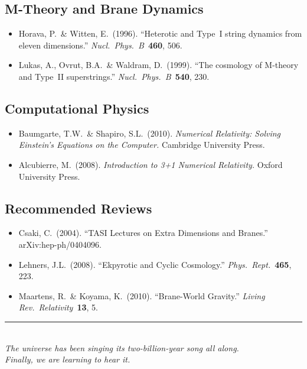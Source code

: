 \subsection*{M-Theory and Brane Dynamics}
\begin{itemize}
  \item Horava, P.\ \& Witten, E.\ (1996). ``Heterotic and Type~I string dynamics from eleven dimensions.'' \textit{Nucl.\ Phys.\ B}\ \textbf{460}, 506.
  \item Lukas, A., Ovrut, B.A.\ \& Waldram, D.\ (1999). ``The cosmology of M-theory and Type~II superstrings.'' \textit{Nucl.\ Phys.\ B}\ \textbf{540}, 230.
\end{itemize}

\subsection*{Computational Physics}
\begin{itemize}
  \item Baumgarte, T.W.\ \& Shapiro, S.L.\ (2010). \textit{Numerical Relativity: Solving Einstein's Equations on the Computer.} Cambridge University Press.
  \item Alcubierre, M.\ (2008). \textit{Introduction to 3+1 Numerical Relativity.} Oxford University Press.
\end{itemize}

\subsection*{Recommended Reviews}
\begin{itemize}
  \item Csaki, C.\ (2004). ``TASI Lectures on Extra Dimensions and Branes.'' arXiv:hep-ph/0404096.
  \item Lehners, J.L.\ (2008). ``Ekpyrotic and Cyclic Cosmology.'' \textit{Phys.\ Rept.}\ \textbf{465}, 223.
  \item Maartens, R.\ \& Koyama, K.\ (2010). ``Brane-World Gravity.'' \textit{Living Rev.\ Relativity}\ \textbf{13}, 5.
\end{itemize}

\bigskip

\begin{center}
\rule{0.5\textwidth}{0.4pt}\\[1em]
\textit{The universe has been singing its two-billion-year song all along.\\
Finally, we are learning to hear it.}
\end{center}
